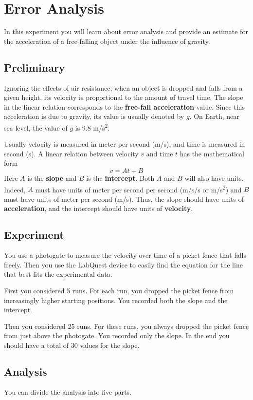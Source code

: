 \setcounter{chapter}{0}
\chapter{Error Analysis}
%
In this experiment you will learn about error analysis and provide an estimate for the acceleration of a free-falling object under the influence of gravity.
%
\section{Preliminary}
%
Ignoring the effects of air resistance, when an object is dropped and falls from a given height, its velocity is proportional to the amount of travel time. The slope in the linear relation corresponds to the \textbf{free-fall acceleration} value. Since this acceleration is due to gravity, its value is usually denoted by $g$. On Earth, near sea level, the value of $g$ is 9.8 m/s\textsuperscript{2}.

Usually velocity is measured in meter per second (m/s), and time is measured in second (s). A linear relation between velocity $v$ and time $t$ has the mathematical form
\begin{equation}
    v = A t + B
\end{equation}
Here $A$ is the \textbf{slope} and $B$ is the \textbf{intercept}. Both $A$ and $B$ will also have units. Indeed, $A$ must have units of meter per second per second (m/s/s or m/s\textsuperscript{2}) and $B$ must have units of meter per second (m/s). Thus, the slope should have units of \textbf{acceleration}, and the intercept should have units of \textbf{velocity}.
%
\section{Experiment}
%
You use a photogate to measure the velocity over time of a picket fence that falls freely. Then you use the LabQuest device to easily find the equation for the line that best fits the experimental data.

First you considered 5 runs. For each run, you dropped the picket fence from increasingly higher starting positions. You recorded both the slope and the intercept.

Then you considered 25 runs. For these runs, you always dropped the picket fence from just above the photogate. You recorded only the slope. In the end you should have a total of 30 values for the slope.
%
\section{Analysis}
%
You can divide the analysis into five parts.
%
